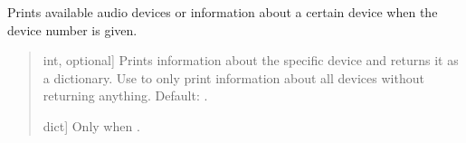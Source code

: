 \documentclass[letterpaper,10pt,english]{sphinxmanual}
\begin{document}
\begin{fulllineitems}
\label{\detokenize{modules/dsptoolbox.audio_io:dsptoolbox.audio_io.print_device_info}}
\pysigstartsignatures
{}
\pysigstopsignatures
\sphinxAtStartPar
Prints available audio devices or information about a certain device
when the device number is given.
\begin{quote}\begin{description}
\begin{description}
\sphinxlineitem{\sphinxstylestrong{device\_number}}{[}int, optional{]}
\sphinxAtStartPar
Prints information about the specific device and returns it as
a dictionary. Use  to only print information about all devices
without returning anything. Default: .

\end{description}

\begin{description}
\sphinxlineitem{\sphinxstylestrong{d}}{[}dict{]}
\sphinxAtStartPar
Only when .

\end{description}

\end{description}\end{quote}

\end{fulllineitems}

\end{document}
